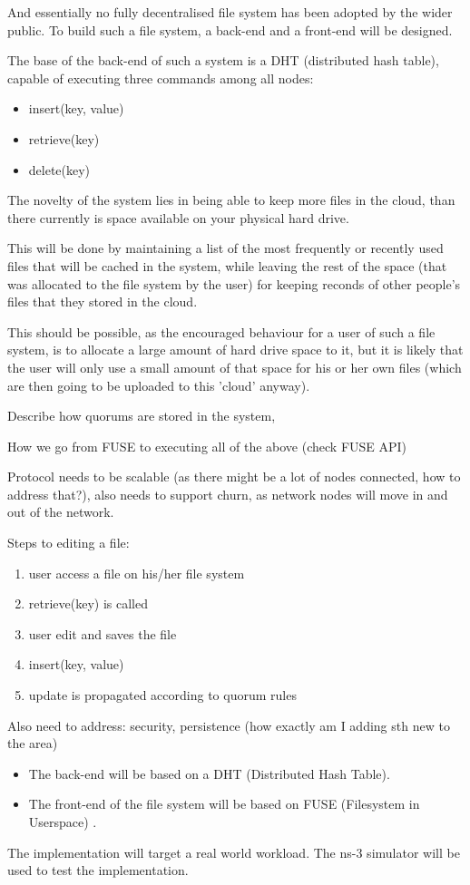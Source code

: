 \documentclass[8pt,a4paper]{article}
\begin{document}
And essentially no fully decentralised file system has been adopted by the wider public. 
To build such a file system, a back-end and a front-end will be designed.

The base of the back-end of such a system is a DHT (distributed hash table), capable of executing three commands among all nodes:
\begin{itemize}
\item insert(key, value)
\item retrieve(key)
\item delete(key)
\end{itemize}

The novelty of the system lies in being able to keep more files in the cloud, than there currently is space available on your physical hard drive. 

This will be done by maintaining a list of the most frequently or recently used files that will be cached in the system, while leaving the rest of the space (that was allocated to the file system by the user) for keeping reconds of other people's files that they stored in the cloud.

This should be possible, as the encouraged behaviour for a user of such a file system, is to allocate a large amount of hard drive space to it, but it is likely that the user will only use a small amount of that space for his or her own files (which are then going to be uploaded to this 'cloud' anyway).

Describe how quorums are stored in the system,

How we go from FUSE to executing all of the above (check FUSE API)

Protocol needs to be scalable (as there might be a lot of nodes connected, how to address that?), also needs to support churn, as network nodes will move in and out of the network.

Steps to editing a file:
\begin{enumerate}
\item user access a file on his/her file system
\item retrieve(key) is called
\item user edit and saves the file
\item insert(key, value)
\item update is propagated according to quorum rules
\end{enumerate}

Also need to address: security, persistence (how exactly am I adding sth new to the area)
\begin{itemize}
\item The back-end will be based on a DHT (Distributed Hash Table). 
\item The front-end of the file system will be based on FUSE (Filesystem in Userspace) \cite{fuse}.
\end{itemize}
The implementation will target a real world workload. The ns-3 \cite{ns3} simulator will be used to test the implementation.
\end{document}
